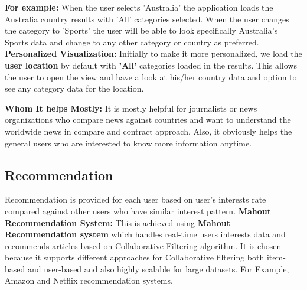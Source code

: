 \begin{enumerate}
       \hspace*{1cm}\textbf{For example:} When the user selects 'Australia' the application loads the Australia country results with 'All' categories selected. When the user changes the category to 'Sports' the user will be able to look specifically Australia's Sports data and change to any other category or country as preferred. \newline
        \textbf{ Personalized Visualization:}\newline
      Initially to make it more personalized, we load the \textbf{user location} by default with \textbf{'All'} categories loaded in the results. 
      This allows the user to open the view and have a look at his/her country data and option to see any category data for the location.
      
     \textbf{ Whom It helps Mostly:} It is mostly helpful for journalists or news organizations who compare news against countries and want to understand the worldwide news in compare and contract approach.
     Also, it obviously helps the general users who are interested to know more information anytime.
    
\end{enumerate}

\subsection{Recommendation}
Recommendation is provided for each user based on user's interests rate compared against other users who have similar interest pattern.\newline
\textbf{Mahout Recommendation System:}
This is achieved using \textbf{Mahout Recommendation system} which handles real-time users interests data and recommends articles based on Collaborative Filtering algorithm. It is chosen because it supports different approaches for Collaborative filtering both item-based and user-based and also highly scalable for large datasets\cite{mahout_2012}.
For Example, Amazon and Netflix recommendation systems.

